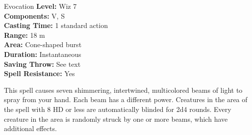 {Evocation}
{
	\textbf{Level:}
	Wiz 7\\
	\textbf{Components:}
	V, S\\
	\textbf{Casting Time:}
	1 standard action\\
	\textbf{Range:}
	18 m\\
	\textbf{Area:}
	Cone-shaped burst\\
	\textbf{Duration:}
	Instantaneous\\
	\textbf{Saving Throw:}
	See text\\
	\textbf{Spell Resistance:}
	Yes\\
}
{
	This spell causes seven shimmering, intertwined, multicolored beams of light to spray from your hand. Each beam has a different power. Creatures in the area of the spell with 8 HD or less are automatically blinded for 2d4 rounds. Every creature in the area is randomly struck by one or more beams, which have additional effects.



}
